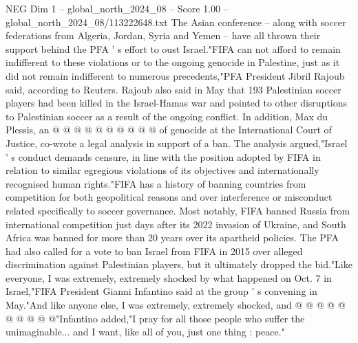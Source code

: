 \begin{textsample}{NEG Dim 1 – global\_north\_2024\_08 – Score 1.00 – global\_north\_2024\_08/113222648.txt}
The Asian conference -- along with soccer federations from Algeria, Jordan, Syria and Yemen -- have all thrown their support behind the PFA ' s effort to oust Israel."FIFA can not afford to remain indifferent to these violations or to the ongoing genocide in Palestine, just as it did not remain indifferent to numerous precedents,"PFA President Jibril Rajoub said, according to Reuters.
Rajoub also said in May that 193 Palestinian soccer players had been killed in the Israel-Hamas war and pointed to other disruptions to Palestinian soccer as a result of the ongoing conflict.
In addition, Max du Plessis, an @ @ @ @ @ @ @ @ @ @ of genocide at the International Court of Justice, co-wrote a legal analysis in support of a ban.
The analysis argued,"Israel ' s conduct demands censure, in line with the position adopted by FIFA in relation to similar egregious violations of its objectives and internationally recognised human rights."FIFA has a history of banning countries from competition for both geopolitical reasons and over interference or misconduct related specifically to soccer governance.
Most notably, FIFA banned Russia from international competition just days after its 2022 invasion of Ukraine, and South Africa was banned for more than 20 years over its apartheid policies.
The PFA had also called for a vote to ban Israel from FIFA in 2015 over alleged discrimination against Palestinian players, but it ultimately dropped the bid."Like everyone, I was extremely, extremely shocked by what happened on Oct. 7 in Israel,"FIFA President Gianni Infantino said at the group ' s convening in May."And like anyone else, I was extremely, extremely shocked, and @ @ @ @ @ @ @ @ @ @"Infantino added,"I pray for all those people who suffer the unimaginable... and I want, like all of you, just one thing : peace."

\end{textsample}

